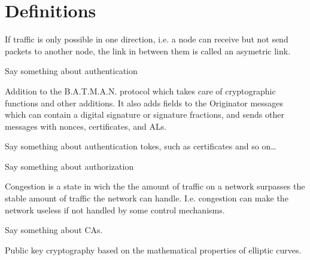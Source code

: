 \chapter*{Definitions}


\begin{acronym}


	If traffic is only possible in one direction, i.e. a node can receive but not
	send packets to another node, the link in between them is called an asymetric
	link.


	Say something about authentication

	Addition to the B.A.T.M.A.N. protocol which takes care of cryptographic
	functions and other additions. It also adds fields to the Originator messages
	which can contain a digital signature or signature fractions, and sends other
	messages with nonces, certificates, and ALs.

	Say something about authentication tokes, such as certificates and so on\ldots

	Say something about authorization

	Congestion is a state in wich the the amount of traffic on a network surpasses
	the stable amount of traffic the network can handle. I.e. congestion can make
	the network useless if not handled by some control mechanisms.
	
	Say something about CAs.


	Public key cryptography based on the mathematical properties of elliptic
	curves.


\end{acronym}
